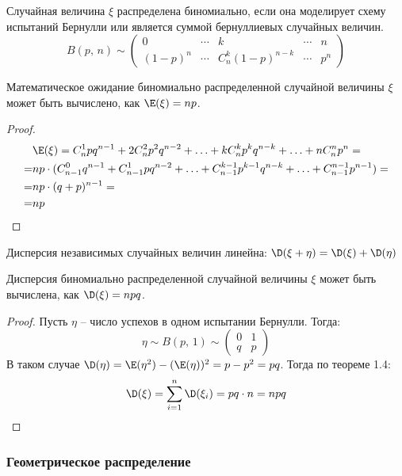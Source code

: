 \documentclass[12pt]{article}
\begin{document}
\begin{definition}
    Случайная величина $\xi$ распределена биномиально, если она моделирует схему испытаний  Бернулли или является суммой бернуллиевых случайных величин.
    $$B(p,\,n)\sim \begin{pmatrix}
        0 & \cdots & k & \cdots & n\\
        (1-p)^n & \cdots & C_n^k(1-p)^{n-k} & \cdots & p^n
    \end{pmatrix}$$
\end{definition}

\begin{theorem}
    Математическое ожидание биномиально распределенной случайной величины $\xi$ может быть вычислено, как $\E(\xi)=np$.
\end{theorem}

\begin{proof}
    \begin{align*}
        &\E(\xi) = C_n^1pq^{n-1} + 2C_n^2p^2q^{n-2} + \ldots + kC_n^kp^kq^{n-k} + \ldots + nC_n^np^n = \\
        =& np \cdot (C_{n-1}^0q^{n-1} + C_{n-1}^1pq^{n-2}+\ldots + C_{n-1}^{k-1}p^{k-1}q^{n-k} + \ldots + C_{n-1}^{n-1}p^{n-1})=\\
        =& np \cdot (q+p)^{n-1}=\\
        =& np
    \end{align*}
\end{proof}

\begin{theorem}
    Дисперсия независимых случайных величин линейна: $\D(\xi+\eta)=\D(\xi)+\D(\eta)$
\end{theorem}

\begin{lemma}
    Дисперсия биномиально распределенной случайной величины $\xi$ может быть вычислена, как $\D(\xi)=npq$.
\end{lemma}

\begin{proof}
    Пусть $\eta$ -- число успехов в одном испытании Бернулли. Тогда:
    $$\eta \sim B(p,\,1) \sim \begin{pmatrix}
        0 & 1\\
        q & p
    \end{pmatrix}$$
    В таком случае $\D(\eta)=\E(\eta^2)-(\E(\eta))^2=p-p^2=pq$. Тогда по теореме 1.4:
    $$\D(\xi)=\sum_{i=1}^{n}\D(\xi_i)=pq \cdot n = npq$$
\end{proof}

\subsubsection{Геометрическое распределение}
\end{document}
